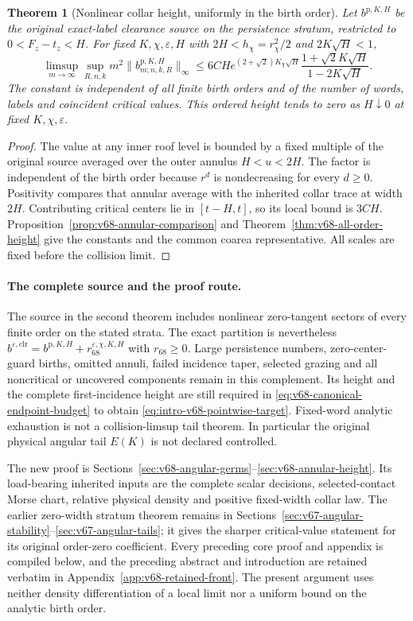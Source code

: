 \documentclass[11pt,reqno]{amsart}
\numberwithin{equation}{section}
\newtheorem{leadtheorem}{Theorem}
\theoremstyle{definition}\newtheorem{definition}[theorem]{Definition}
\theoremstyle{remark}\newtheorem{remark}[theorem]{Remark}
\begin{document}
\begin{leadtheorem}[Nonlinear collar height, uniformly in the birth order]
\label{thm:intro-v68-height}
Let $b^{\mathrm p,K,H}$ be the original exact-label clearance source
on the persistence stratum, restricted to $0<F_z-t_z<H$. For fixed
$K,\chi,\varepsilon,H$ with $2H<h_\chi=r_\chi^2/2$ and
$2K\sqrt H<1$,
\[
 \limsup_{m\to\infty}\sup_{R,n,k}
          m^2\|b^{\mathrm p,K,H}_{m;n,k,R}\|_\infty
 \le6CH e^{(2+\sqrt2)K_\chi\sqrt H}
                     \frac{1+\sqrt2K\sqrt H}{1-2K\sqrt H}.
\]
The constant is independent of all finite birth orders and of the
number of words, labels and coincident critical values. This ordered
height tends to zero as $H\downarrow0$ at fixed $K,\chi,\varepsilon$.
\end{leadtheorem}
\begin{proof}
The value at any inner roof level is bounded by a fixed multiple of
the original source averaged over the outer annulus $H<u<2H$.
The factor is independent of the birth order because $r^d$ is
nondecreasing for every $d\ge0$. Positivity compares that annular
average with the inherited collar trace at width $2H$. Contributing
critical centers lie in $[t-H,t]$, so its local bound is $3CH$.
Proposition~\ref{prop:v68-annular-comparison} and
Theorem~\ref{thm:v68-all-order-height} give the constants and the
common coarea representative. All scales are fixed before the
collision limit.
\end{proof}

\paragraph{The complete source and the proof route.}
The source in the second theorem includes nonlinear zero-tangent
sectors of every finite order on the stated strata. The exact partition
is nevertheless
$b^{\varepsilon,\mathrm{clr}}=b^{\mathrm p,K,H}
+r_{68}^{\varepsilon,\chi,K,H}$ with $r_{68}\ge0$.
Large persistence numbers, zero-center-guard births, omitted annuli,
failed incidence taper, selected grazing and all noncritical or
uncovered components remain in this complement. Its height and the
complete first-incidence height are still required in
\eqref{eq:v68-canonical-endpoint-budget} to obtain
\eqref{eq:intro-v68-pointwise-target}. Fixed-word analytic exhaustion
is not a collision-limsup tail theorem. In particular the original
physical angular tail $E(K)$ is not declared controlled.

The new proof is Sections~\ref{sec:v68-angular-germs}--\ref{sec:v68-annular-height}.
Its load-bearing inherited inputs are the complete scalar decisions,
selected-contact Morse chart, relative physical density and positive
fixed-width collar law. The earlier zero-width stratum theorem remains
in Sections~\ref{sec:v67-angular-stability}--\ref{sec:v67-angular-tails};
it gives the sharper critical-value statement for its original
order-zero coefficient. Every preceding core proof and appendix is
compiled below, and the preceding abstract and introduction are retained
verbatim in Appendix~\ref{app:v68-retained-front}. The present argument
uses neither density differentiation of a local limit nor a uniform
bound on the analytic birth order.
\end{document}
